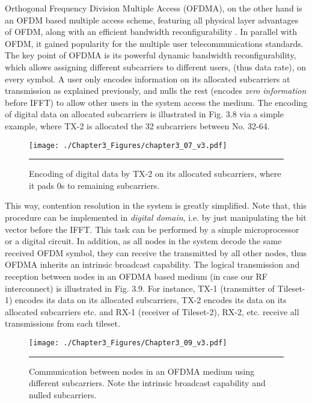 Orthogonal Frequency Division Multiple Access (OFDMA), on the other hand is an OFDM based multiple access scheme, featuring all physical layer advantages of OFDM, along with an efficient bandwidth reconfigurability \cite{pietrzyk2006ofdma}. In parallel with OFDM, it gained popularity for the multiple user telecommunications standards. The key point of OFDMA is its powerful dynamic bandwidth reconfigurability, which allows assigning different subcarriers to different users, (thus data rate), on every symbol. A user only encodes information on its allocated subcarriers at transmission as explained previously, and nulls the rest (encodes \textit{zero information} before IFFT) to allow other users in the system access the medium. The encoding of digital data on allocated subcarriers is illustrated in Fig. 3.8 via a simple example, where TX-2 is allocated the 32 subcarriers between No. 32-64. 

\begin{figure}[htbp]
  \centering
    \texttt{[image: ./Chapter3\_Figures/chapter3\_07\_v3.pdf]}
    \rule{35em}{0.5pt}
  \caption[Encoding of digital data by TX-2 on its allocated subcarriers.]{Encoding of digital data by TX-2 on its allocated subcarriers, where it pads 0s to remaining subcarriers.}
  \label{fig:Electron}
\end{figure}


This way, contention resolution in the system is greatly simplified. Note that, this procedure can be implemented in \textit{digital domain}, i.e. by just manipulating the bit vector before the IFFT. This task can be performed by a simple microprocessor or a digital circuit. In addition, as all nodes in the system decode the same received OFDM symbol, they can receive the transmitted by all other nodes, thus OFDMA inherits an intrinsic broadcast capability. The logical transmission and reception between nodes in an OFDMA based medium (in case our RF interconnect) is illustrated in Fig. 3.9. For instance, TX-1 (transmitter of Tileset-1) encodes its data on its allocated subcarriers, TX-2 encodes its data on its allocated subcarriers etc. and RX-1 (receiver of Tileset-2), RX-2, etc. receive all transmissions from each tileset.  


\begin{figure}[htbp]
  \centering
    \texttt{[image: ./Chapter3\_Figures/Chapter3\_09\_v3.pdf]}
    \rule{35em}{0.5pt}
  \caption[Communication between nodes in an OFDMA medium]{Communication between nodes in an OFDMA medium using different subcarriers. Note the intrinsic broadcast capability and nulled subcarriers.}
  \label{fig:Electron}
\end{figure}


